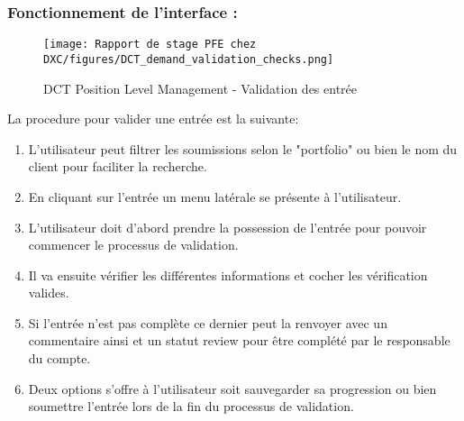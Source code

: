 \subsubsection{Fonctionnement de l'interface :}

\begin{figure}[H]
    \centering
    \texttt{[image: Rapport de stage PFE chez DXC/figures/DCT\_demand\_validation\_checks.png]}
    \caption{DCT Position Level Management - Validation des entrée}
\end{figure}

La procedure pour valider une entrée est la suivante:

\begin{enumerate}
    
    \item L'utilisateur peut filtrer les soumissions selon le "portfolio" ou bien le nom du client pour faciliter la recherche.
    \vspace{0.1cm}
    \item En cliquant sur l'entrée un menu latérale se présente à l'utilisateur.
    \vspace{0.1cm}
    \item L'utilisateur doit d'abord prendre la possession de l'entrée pour pouvoir commencer le processus de validation.
    \vspace{0.1cm}
    \item Il va ensuite vérifier les différentes informations et cocher les vérification valides.
    \vspace{0.1cm}
    \item Si l'entrée n'est pas complète ce dernier peut la renvoyer avec un commentaire ainsi et un statut review pour être complété par le responsable du compte.
    \vspace{0.1cm}
    \item Deux options s'offre à l'utilisateur soit sauvegarder sa progression ou bien soumettre l'entrée lors de la fin du processus de validation.

\end{enumerate}